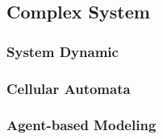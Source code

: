 






\subsection{Complex System} %
\label{sub:complex_system}
\subsubsection{System Dynamic}

\subsubsection{Cellular Automata}

\subsubsection{Agent-based Modeling}
